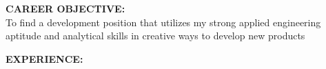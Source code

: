 


{\large \textbf{CAREER OBJECTIVE:}}\\
To find a development position that utilizes my strong applied engineering aptitude and analytical skills in creative ways to develop new products \bigskip 



{\large \textbf{EXPERIENCE:}}\\ 



% 




% 



% 

\pagebreak



